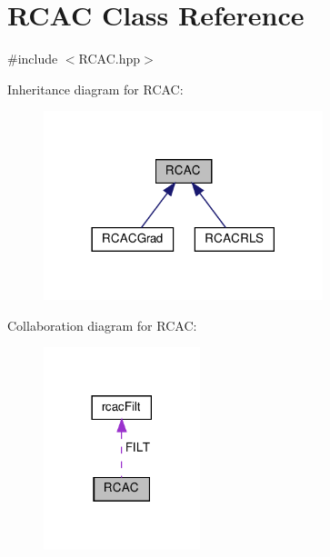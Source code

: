 \hypertarget{class_r_c_a_c}{}\section{R\+C\+AC Class Reference}
\label{class_r_c_a_c}


{\ttfamily \#include $<$R\+C\+A\+C.\+hpp$>$}



Inheritance diagram for R\+C\+AC\+:\nopagebreak
\begin{figure}[H]
\begin{center}
\leavevmode
\includegraphics[width=230pt]{class_r_c_a_c__inherit__graph}
\end{center}
\end{figure}


Collaboration diagram for R\+C\+AC\+:\nopagebreak
\begin{figure}[H]
\begin{center}
\leavevmode
\includegraphics[width=129pt]{class_r_c_a_c__coll__graph}
\end{center}
\end{figure}
